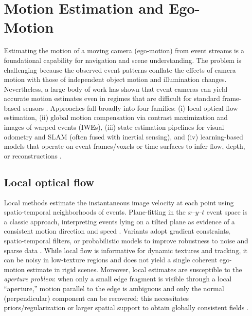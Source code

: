 \section{Motion Estimation and Ego-Motion}
\label{sec:ego-motion}

Estimating the motion of a moving camera (ego-motion) from event streams is a foundational capability for navigation and scene understanding. The problem is challenging because the observed event patterns conflate the effects of camera motion with those of independent object motion and illumination changes. Nevertheless, a large body of work has shown that event cameras can yield accurate motion estimates even in regimes that are difficult for standard frame-based sensors \cite{Gallego2020Survey}. Approaches fall broadly into four families: (i) local optical-flow estimation, (ii) global motion compensation via contrast maximization and images of warped events (IWEs), (iii) state-estimation pipelines for visual odometry and SLAM (often fused with inertial sensing), and (iv) learning-based models that operate on event frames/voxels or time surfaces to infer flow, depth, or reconstructions \cite{Bardow2016SOFIE,Gallego2018CMax,Rebecq2017EVO,Rebecq2019E2VID,Zhu2019Unsupervised,Gallego2020Survey}.

\subsection{Local optical flow}
Local methods estimate the instantaneous image velocity at each point using spatio-temporal neighborhoods of events. Plane-fitting in the $x$–$y$–$t$ event space is a classic approach, interpreting events lying on a tilted plane as evidence of a consistent motion direction and speed \cite{Benosman2014Epipolar}. Variants adopt gradient constraints, spatio-temporal filters, or probabilistic models to improve robustness to noise and sparse data \cite{Gallego2020Survey}. While local flow is informative for dynamic textures and tracking, it can be noisy in low-texture regions and does not yield a single coherent ego-motion estimate in rigid scenes. Moreover, local estimates are susceptible to the \emph{aperture problem}: when only a small edge fragment is visible through a local ``aperture,'' motion parallel to the edge is ambiguous and only the normal (perpendicular) component can be recovered; this necessitates priors/regularization or larger spatial support to obtain globally consistent fields \cite{Gallego2020Survey}.

